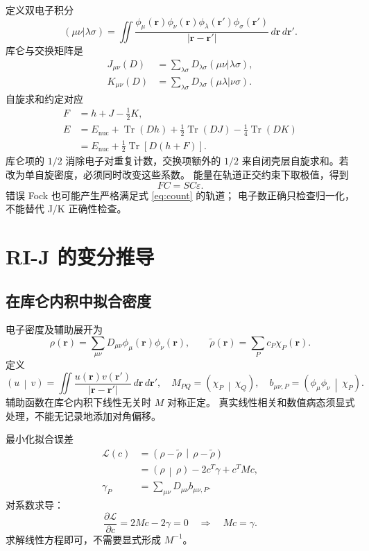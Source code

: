 \documentclass[UTF8,fontset=fandol,11pt,a4paper]{ctexart}
\numberwithin{equation}{section}
\newcommand{\Tr}{\operatorname{Tr}}
\newcommand{\inner}[2]{\left(#1\,\middle|\,#2\right)}
\begin{document}
定义双电子积分
\begin{equation}
(\mu\nu|\lambda\sigma)=
\iint\frac{\phi_\mu(\bm r)\phi_\nu(\bm r)
\phi_\lambda(\bm r')\phi_\sigma(\bm r')}
{|\bm r-\bm r'|}\,d\bm r\,d\bm r'.
\end{equation}
库仑与交换矩阵是
\begin{align}
J_{\mu\nu}(D)&=\sum_{\lambda\sigma}D_{\lambda\sigma}
(\mu\nu|\lambda\sigma),\label{eq:Jdef}\\
K_{\mu\nu}(D)&=\sum_{\lambda\sigma}D_{\lambda\sigma}
(\mu\lambda|\nu\sigma).\label{eq:Kdef}
\end{align}
自旋求和约定对应
\begin{align}
F&=h+J-\tfrac12K,\\
E&=E_{\mathrm{nuc}}+\Tr(Dh)+\tfrac12\Tr(DJ)-\tfrac14\Tr(DK)
\label{eq:energy}\\
 &=E_{\mathrm{nuc}}+\tfrac12\Tr[D(h+F)].
\end{align}
库仑项的 \(1/2\) 消除电子对重复计数，交换项额外的 \(1/2\)
来自闭壳层自旋求和。若改为单自旋密度，必须同时改变这些系数。
能量在轨道正交约束下取极值，得到
\begin{equation}
FC=SC\varepsilon.
\end{equation}
错误 Fock 也可能产生严格满足式 \eqref{eq:count} 的轨道；
电子数正确只检查归一化，不能替代 J/K 正确性检查。

\section{RI-J 的变分推导}
\label{sec:ri}
\subsection{在库仑内积中拟合密度}
电子密度及辅助展开为
\begin{equation}
\rho(\bm r)=\sum_{\mu\nu}D_{\mu\nu}\phi_\mu(\bm r)\phi_\nu(\bm r),
\qquad \widetilde\rho(\bm r)=\sum_Pc_P\chi_P(\bm r).
\end{equation}
定义
\begin{equation}
\inner{u}{v}=\iint\frac{u(\bm r)v(\bm r')}{|\bm r-\bm r'|}
\,d\bm r\,d\bm r',
\quad
M_{PQ}=\inner{\chi_P}{\chi_Q},
\quad
b_{\mu\nu,P}=\inner{\phi_\mu\phi_\nu}{\chi_P}.
\end{equation}
辅助函数在库仑内积下线性无关时 \(M\) 对称正定。
真实线性相关和数值病态须显式处理，不能无记录地添加对角偏移。

最小化拟合误差
\begin{align}
\mathcal L(c)&=\inner{\rho-\widetilde\rho}{\rho-\widetilde\rho}\\
&=\inner{\rho}{\rho}-2c^T\gamma+c^TMc,\\
\gamma_P&=\sum_{\mu\nu}D_{\mu\nu}b_{\mu\nu,P}.
\end{align}
对系数求导：
\begin{equation}
\frac{\partial\mathcal L}{\partial c}=2Mc-2\gamma=0
\quad\Longrightarrow\quad Mc=\gamma.
\label{eq:normal}
\end{equation}
求解线性方程即可，不需要显式形成 \(M^{-1}\)。
\end{document}
